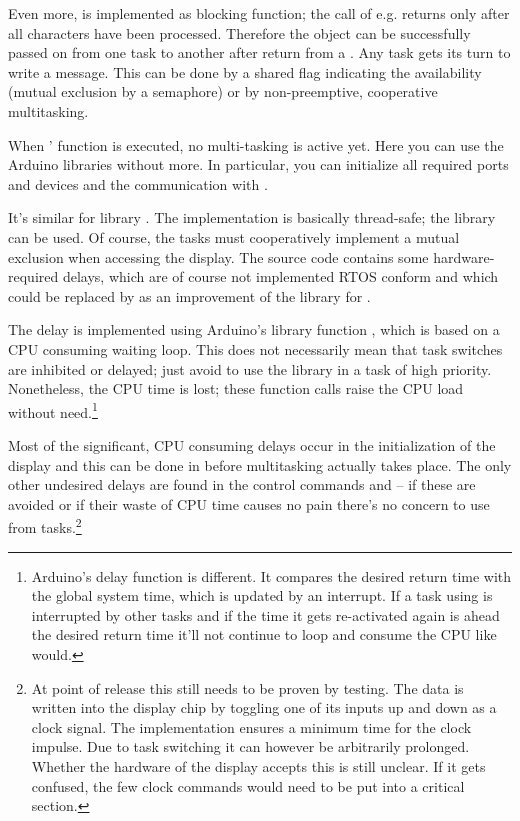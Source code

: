 Even more,  is implemented as blocking function; the call of
e.g.  returns only after all characters have been processed.
Therefore the object can be successfully passed on from one task to another
after return from a . Any task gets its turn to write a
message. This can be done by a shared flag indicating the availability
(mutual exclusion by a semaphore) or by non-preemptive, cooperative
multitasking.

When \rtos{}' function  is executed, no multi-tasking is
active yet. Here you can use the Arduino libraries without more. In
particular, you can initialize all required ports and devices and the
communication with .

It's similar for library . The implementation is
basically thread-safe; the library can be used. Of course, the tasks must
cooperatively implement a mutual exclusion when accessing the display. The
source code contains some hardware-required delays, which are of
course not implemented RTOS conform and which could be replaced by
 as an improvement of the library for \rtos. 

The delay is implemented using Arduino's library function
, which is based on a CPU consuming waiting loop.
This does not necessarily mean that task switches are inhibited or
delayed; just avoid to use the library in a task of high priority.
Nonetheless, the CPU time is lost; these function calls raise the CPU load
without need.\footnote{Arduino's delay function 
is different. It compares the desired return time with the
global system time, which is updated by an interrupt. If a task using
 is interrupted by other tasks and if the time it gets
re-activated again is ahead the desired return time it'll not continue to
loop and consume the CPU like  would.}

Most of the significant, CPU consuming delays occur in the initialization
of the display and this can be done in  before multitasking
actually takes place. The only other undesired delays are found in the
control commands  and  -- if these are avoided or
if their waste of CPU time causes no pain there's no concern to use
 from \rtos{} tasks.\footnote{At point of release
this still needs to be proven by testing. The data is written into the
display chip by toggling one of its inputs up and down as a clock signal.
The implementation ensures a minimum time for the clock impulse. Due to
task switching it can however be arbitrarily prolonged. Whether the
hardware of the display accepts this is still unclear. If it gets
confused, the few clock commands would need to be put into a critical
section.}

